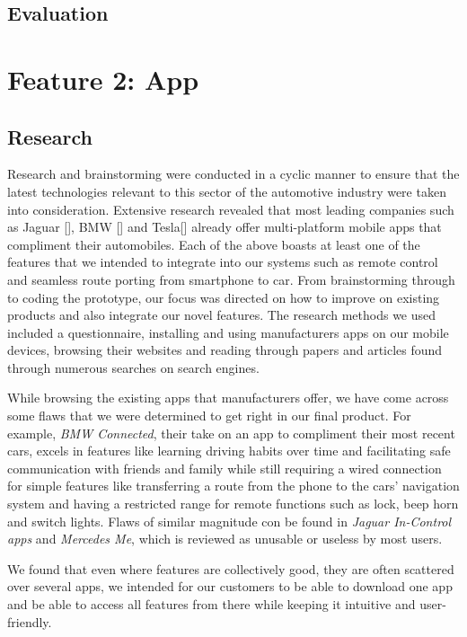 \documentclass{article}
\begin{document}
\subsection{Evaluation}\label{ssec:nav-evaluation}


%
%
\section{Feature 2: App}\label{sec:app}

\subsection{Research}\label{ssec:app-research}
Research and brainstorming were conducted in a cyclic manner to ensure that the latest technologies relevant to this sector of the automotive industry were taken into consideration. Extensive research revealed that most leading companies such as Jaguar [\textcite{jaguar-ws}], BMW [\textcite{bmw-ws}] and Tesla[\textcite{tesla-ws}] already offer multi-platform mobile apps that compliment their automobiles. Each of the above boasts at least one of the features that we intended to integrate into our systems such as remote control and seamless route porting from smartphone to car. From brainstorming through to coding the prototype, our focus was directed on how to improve on existing products and also integrate our novel features.
The research methods we used included a questionnaire, installing and using manufacturers apps on our mobile devices, browsing their websites and reading through papers and articles found through numerous searches on search engines.

While browsing the existing apps that manufacturers offer, we have come across some flaws that  we were determined to get right in our final product. For example, \textit{BMW Connected}, their take on an app to compliment their most recent cars, excels in features like learning driving habits over time and facilitating safe communication with friends and family while still requiring a wired connection for simple features like transferring a route from the phone to the cars' navigation system and having a restricted range for remote functions such as lock, beep horn and switch lights. Flaws of similar magnitude con be found in \textit{Jaguar In-Control apps} and \textit{Mercedes Me}, which is reviewed as unusable or useless by most users.

We found that even where features are collectively good, they are often scattered over several apps, we intended for our customers to be able to download one app and be able to access all features from there while keeping it intuitive and user-friendly.
\end{document}
